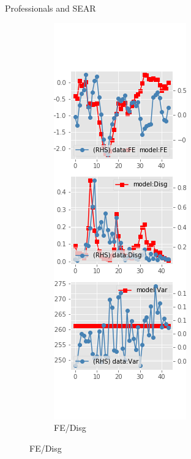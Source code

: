 \documentclass{beamer}
\begin{document}
\begin{frame}{Professionals and SEAR}
\begin{figure}[ht]
\begin{subfigure}[b]{0.2\textwidth}
		\end{subfigure}
		\hfill
		\begin{subfigure}[b]{0.2\textwidth}
			\caption{FE/Disg}
			\includegraphics[width=\textwidth, height = 0.8\textheight]{figuresDraft/spf_se_est_diag2.png}
		\end{subfigure}
	\end{figure}
\end{frame}
\end{document}

